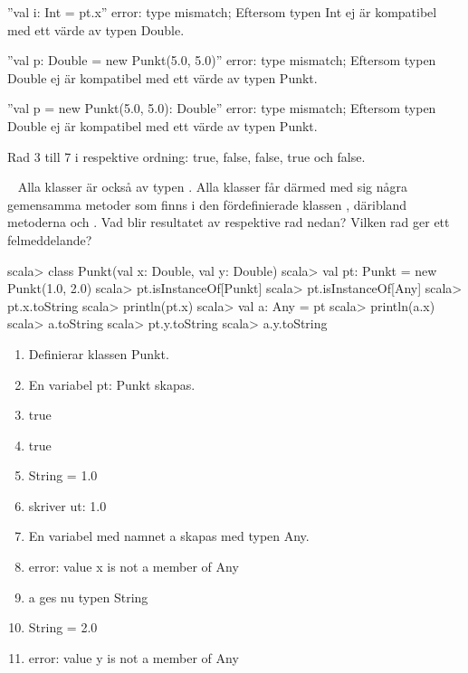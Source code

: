 \SOLUTION


\TaskSolved \what
 

\SubtaskSolved 
''val i: Int = pt.x'' error: type mismatch;
Eftersom typen Int ej är kompatibel med ett värde av typen Double.

''val p: Double = new Punkt(5.0, 5.0)'' error: type mismatch;
Eftersom typen Double ej är kompatibel med ett värde av typen Punkt.

''val p = new Punkt(5.0, 5.0): Double'' error: type mismatch;
Eftersom typen Double ej är kompatibel med ett värde av typen Punkt.

\SubtaskSolved 
Rad 3 till 7 i respektive ordning: true, false, false, true och false.


\QUESTEND









\QUESTBEGIN

\Task  \what~ Alla klasser är också av typen . Alla klasser får därmed med sig några gemensamma metoder som finns i den fördefinierade klassen , däribland metoderna   och .  Vad blir resultatet av respektive rad nedan? Vilken rad ger ett felmeddelande?


\begin{REPL}
scala> class Punkt(val x: Double, val y: Double)
scala> val pt: Punkt = new Punkt(1.0, 2.0)
scala> pt.isInstanceOf[Punkt]
scala> pt.isInstanceOf[Any]
scala> pt.x.toString
scala> println(pt.x)
scala> val a: Any = pt
scala> println(a.x)
scala> a.toString
scala> pt.y.toString
scala> a.y.toString
\end{REPL}

\SOLUTION


\TaskSolved \what
 
\begin{enumerate}
\item Definierar klassen Punkt.
\item En variabel pt: Punkt skapas.
\item true
\item true
\item String = 1.0
\item skriver ut: 1.0
\item En variabel med namnet a skapas med typen Any.
\item error: value x is not a member of Any
\item a ges nu typen String
\item String = 2.0
\item error: value y is not a member of Any
\end{enumerate}


